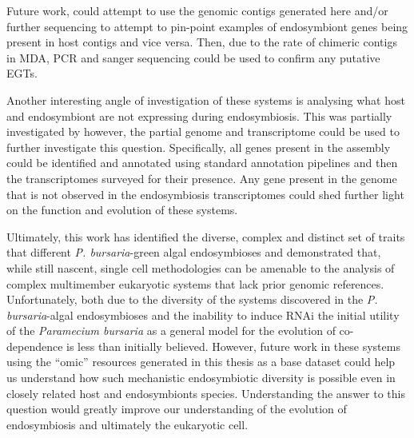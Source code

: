Future work, could attempt to use the genomic contigs generated here
and/or further sequencing to attempt to pin-point examples of endosymbiont
genes being present in host contigs and vice versa. Then, due to the rate of 
chimeric contigs in MDA, PCR and sanger sequencing could be used to confirm
any putative EGTs.

Another interesting angle of investigation of these systems is
analysing what host and endosymbiont are not expressing during endosymbiosis.
This was partially investigated by \citep{Kodama2014} however, 
the partial genome and transcriptome could be used to further
investigate this question.  Specifically, all genes present in the assembly
could be identified and annotated using standard annotation pipelines
and then the transcriptomes surveyed for their presence.  Any gene
present in the genome that is not observed in the endosymbiosis
transcriptomes could shed further light on the function
and evolution of these systems.


Ultimately, this work has identified the diverse, complex and distinct set
of traits that different \textit{P. bursaria}-green algal endosymbioses
and demonstrated that, while still nascent, single cell methodologies
can be amenable to the analysis of complex multimember eukaryotic
systems that lack prior genomic references.  Unfortunately, both due to the
diversity of the systems discovered in the \textit{P. bursaria}-algal endosymbioses
and the inability to induce RNAi the initial 
utility of the \textit{Paramecium bursaria} as a general model for
the evolution of co-dependence is less than initially believed.  
However, future work in these systems using the ``omic'' resources generated in 
this thesis as a base dataset could help us understand how such mechanistic
endosymbiotic diversity is possible even in closely
related host and endosymbionts species. Understanding the answer to this
question would greatly improve our understanding of the evolution of endosymbiosis
and ultimately the eukaryotic cell.









